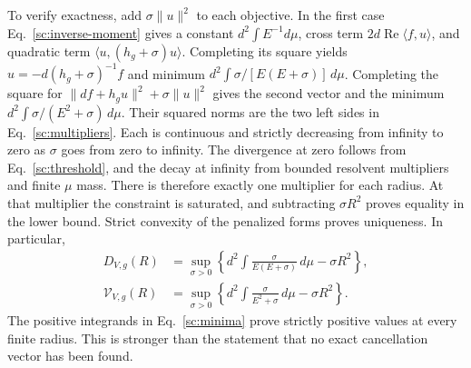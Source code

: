 \documentclass[aps,prl,reprint,superscriptaddress,longbibliography]{revtex4-2}
\begin{document}
To verify exactness, add $\sigma\|u\|^2$ to each objective. In the first
case Eq.~\eqref{sc:inverse-moment} gives a constant
$d^2\int E^{-1}d\mu$, cross term
$2d\operatorname{Re}\langle f,u\rangle$, and quadratic term
$\langle u,(h_g+\sigma)u\rangle$. Completing its square yields
$u=-d(h_g+\sigma)^{-1}f$ and minimum
$d^2\int\sigma/[E(E+\sigma)]\,d\mu$. Completing the square for
$\|df+h_gu\|^2+\sigma\|u\|^2$ gives the second vector and the minimum
$d^2\int\sigma/(E^2+\sigma)\,d\mu$. Their squared norms are the two
left sides in Eq.~\eqref{sc:multipliers}. Each is continuous and strictly
decreasing from infinity to zero as $\sigma$ goes from zero to infinity.
The divergence at zero follows from Eq.~\eqref{sc:threshold}, and the
decay at infinity from bounded resolvent multipliers and finite
$\mu$ mass. There is therefore exactly one multiplier for each radius.
At that multiplier the constraint is saturated, and subtracting
$\sigma R^2$ proves equality in the lower bound. Strict convexity of the
penalized forms proves uniqueness. In particular,
\begin{align}
 D_{V,g}(R)&=\sup_{\sigma>0}
 \left\{d^2\int\frac{\sigma}{E(E+\sigma)}\,d\mu-\sigma R^2\right\},\\
 \mathcal V_{V,g}(R)&=\sup_{\sigma>0}
 \left\{d^2\int\frac{\sigma}{E^2+\sigma}\,d\mu-\sigma R^2\right\}.
 \label{sc:dual}
\end{align}
The positive integrands in Eq.~\eqref{sc:minima} prove strictly positive
values at every finite radius. This is stronger than the statement that
no exact cancellation vector has been found.
\end{document}

